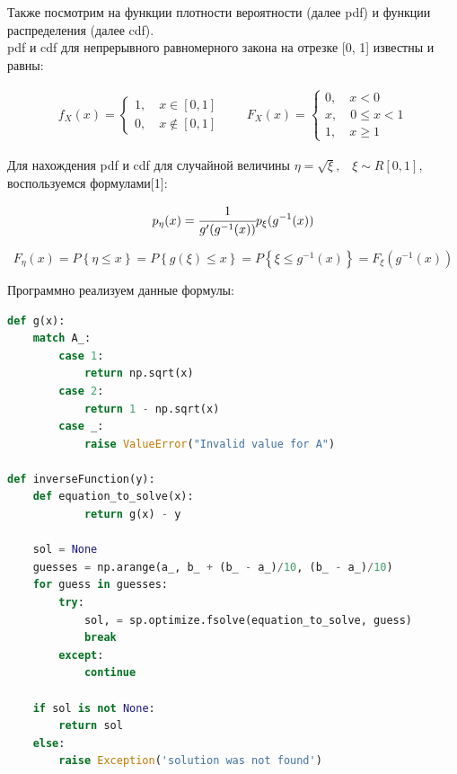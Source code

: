 \documentclass[a4paper, 14pt]{extarticle}
\begin{document}
Также посмотрим на функции плотности вероятности (далее pdf) и функции распределения (далее cdf).\\

pdf и cdf для непрерывного равномерного закона на 
отрезке [0, 1] известны и равны:

\begin{gather*}
  f_X (x) = \begin{cases}
    1, \quad x \in [0, 1] \\
    0, \quad x \notin [0, 1]
  \end{cases}
  \qquad
  F_X(x) = \begin{cases}
    0, \quad x < 0 \\
    x, \quad 0 \leq x < 1 \\
    1, \quad x \geq 1
  \end{cases}
\end{gather*}

Для нахождения pdf и cdf для случайной величины 
$\eta = \sqrt{\xi}, \hspace{10pt} \xi \sim R[0, 1]$, воспользуемся формулами[1]:

\begin{equation}
  p_{\eta}(x) = \cfrac{1}{g'(g^{-1}(x))} p_{\xi}(g^{-1}(x))
\end{equation}

\begin{equation}
  F_\eta (x) = P \left\{ \eta \leq x \right\} = P \left\{ g(\xi) \leq x \right\} = 
  P \left\{ \xi \leq g^{-1}(x) \right\} = F_{\xi} (g^{-1}(x))
\end{equation}

Программно реализуем данные формулы:

\begin{center}
  \begin{lstlisting}[language=Python]
def g(x):
    match A_:
        case 1:
            return np.sqrt(x)
        case 2:
            return 1 - np.sqrt(x)
        case _:
            raise ValueError("Invalid value for A")

def inverseFunction(y):
    def equation_to_solve(x):
            return g(x) - y

    sol = None
    guesses = np.arange(a_, b_ + (b_ - a_)/10, (b_ - a_)/10)
    for guess in guesses:
        try: 
            sol, = sp.optimize.fsolve(equation_to_solve, guess)
            break
        except:
            continue
    
    if sol is not None: 
        return sol
    else: 
        raise Exception('solution was not found')
  \end{lstlisting}
\end{center}
\end{document}

